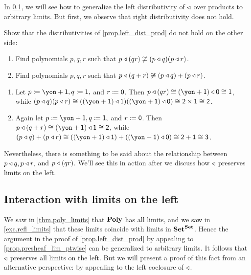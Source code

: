 \documentclass[Book-Poly]{subfiles}
\begin{document}
In \cref{subsec.comon.comp.prop.lim_left}, we will see how to generalize the left distributivity of $\mathbin{\triangleleft}$ over products to arbitrary limits.
But first, we observe that right distributivity does not hold.

\begin{exercise} \label{exc.right_not_dist_prod}
Show that the distributivities of \cref{prop.left_dist_prod} do not hold on the other side:
\begin{enumerate}
	\item \label{exc.right_not_dist_prod.prod} Find polynomials $p,q,r$ such that $p\mathbin{\triangleleft} (qr)\not\cong(p\mathbin{\triangleleft} q)(p\mathbin{\triangleleft} r)$.
	\item Find polynomials $p,q,r$ such that $p\mathbin{\triangleleft} (q+r)\not\cong(p\mathbin{\triangleleft} q)+(p\mathbin{\triangleleft} r)$.
\qedhere
\end{enumerate}
\begin{solution}
\begin{enumerate}
    \item Let $p \coloneqq \yon + \1, q \coloneqq \1,$ and $r \coloneqq \textsf{0}$.
    Then $p \tri (qr) \iso (\yon + \1) \tri \0 \iso \1$, while $(p \tri q)(p \tri r) \iso ((\yon + \1) \tri \1)((\yon + \1) \tri \0) \iso \2 \times \1 \iso \2$.
    \item Again let $p \coloneqq \yon + \1, q \coloneqq \1,$ and $r \coloneqq \textsf{0}$.
    Then $p \tri (q+r) \iso (\yon + \1) \tri \1 \iso \2$, while $(p \tri q)+(p \tri r) \iso ((\yon + \1) \tri \1)+((\yon + \1) \tri \0) \iso \2 + \1 \iso \3$.
\end{enumerate}
\end{solution}
\end{exercise}

Nevertheless, there is something to be said about the relationship between $p\mathbin{\triangleleft} q, p\mathbin{\triangleleft} r,$ and $p\mathbin{\triangleleft}(qr)$.
We'll see this in action after we discuss how $\mathbin{\triangleleft}$ preserves limits on the left.

\subsection{Interaction with limits on the left} \label{subsec.comon.comp.prop.lim_left}

We saw in \cref{thm.poly_limits} that $\mathbf{Poly}$ has all limits, and we saw in \cref{exc.refl_limits} that these limits coincide with limits in $\mathbf{Set}^{\mathbf{Set}}$.
Hence the argument in the proof of \cref{prop.left_dist_prod} by appealing to \cref{prop.presheaf_lim_ptwise} can be generalized to arbitrary limits.
It follows that $\mathbin{\triangleleft}$ preserves all limits on the left.
But we will present a proof of this fact from an alternative perspective: by appealing to the left coclosure of $\mathbin{\triangleleft}$.
\end{document}
